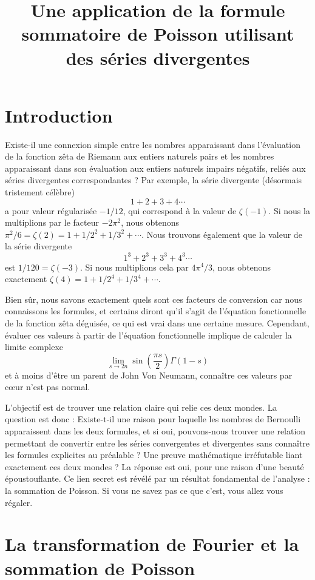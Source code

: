 \documentclass[12pt,a4paper]{article}
\begin{document}
\title{Une application de la formule sommatoire de Poisson utilisant des séries divergentes}
\date{}
\maketitle

\section*{Introduction}
Existe-il une connexion simple entre les nombres apparaissant dans l'évaluation de la fonction zêta de Riemann aux entiers naturels pairs et les nombres apparaissant dans son évaluation aux entiers naturels impairs négatifs, reliés aux séries divergentes correspondantes ? Par exemple, la série divergente (désormais tristement célèbre)
\[ 1+2+3+4\cdots \]
a pour valeur régularisée $-1/12$, qui correspond à la valeur de $\zeta(-1)$. Si nous la multiplions par le facteur $-2\pi^2$, nous obtenons $\pi^2/6 = \zeta(2) = 1+1/2^2+1/3^2+\cdots$. Nous trouvons également que la valeur de la série divergente
\[ 1^3+2^3+3^3+4^3\cdots \]
est $1/120 = \zeta(-3)$. Si nous multiplions cela par $4\pi^4/3$, nous obtenons exactement $\zeta(4) = 1+1/2^4+1/3^4+\cdots$.

Bien sûr, nous savons exactement quels sont ces facteurs de conversion car nous connaissons les formules, et certains diront qu'il s'agit de l'équation fonctionnelle de la fonction zêta déguisée, ce qui est vrai dans une certaine mesure. Cependant, évaluer ces valeurs à partir de l'équation fonctionnelle implique de calculer la limite complexe
\[ \lim_{s\to 2n} \sin\left(\frac{\pi s}{2}\right)\Gamma(1-s) \]
et à moins d'être un parent de John Von Neumann, connaître ces valeurs par cœur n'est pas normal.

L'objectif est de trouver une relation claire qui relie ces deux mondes. La question est donc : Existe-t-il une raison pour laquelle les nombres de Bernoulli apparaissent dans les deux formules, et si oui, pouvons-nous trouver une relation permettant de convertir entre les séries convergentes et divergentes sans connaître les formules explicites au préalable ? Une preuve mathématique irréfutable liant exactement ces deux mondes ? La réponse est oui, pour une raison d'une beauté époustouflante. Ce lien secret est révélé par un résultat fondamental de l'analyse : la sommation de Poisson. Si vous ne savez pas ce que c'est, vous allez vous régaler.

\section*{La transformation de Fourier et la sommation de Poisson}
\end{document}
